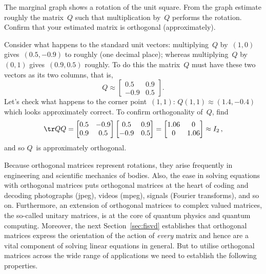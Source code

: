 \begin{example} \label{eg:introt}
The marginal graph shows a rotation of the unit square. 
\def\unithousesize{footnotesize,grid} 
%
From the graph estimate roughly the matrix~\(Q\) such that multiplication by~\(Q\) performs the rotation. 
Confirm that your estimated matrix is orthogonal (approximately).
\begin{solution} 
Consider what happens to the standard unit vectors:  multiplying~\(Q\) by~\((1,0)\) gives~\((0.5,-0.9)\) to roughly (one decimal place); whereas multiplying~\(Q\) by~\((0,1)\) gives~\((0.9,0.5)\) roughly.
To do this the matrix~\(Q\) must have these two vectors as its two columns, that is,
\begin{equation*}
Q\approx\begin{bmatrix} 0.5&0.9\\-0.9&0.5 \end{bmatrix}.
\end{equation*}
Let's check what happens to the corner point~\((1,1)\): \(Q(1,1)\approx (1.4,-0.4)\) which looks approximately correct.
To confirm orthogonality of~\(Q\), find
\begin{equation*}
\tr QQ=\begin{bmatrix} 0.5&-0.9\\0.9&0.5 \end{bmatrix}
\begin{bmatrix} 0.5&0.9\\-0.9&0.5 \end{bmatrix}
=\begin{bmatrix} 1.06&0\\0&1.06 \end{bmatrix}\approx I_2\,,
\end{equation*}
and so \(Q\)~is approximately orthogonal.
\end{solution}
\end{example}


Because orthogonal matrices represent rotations, they arise frequently in engineering and scientific mechanics of bodies.
Also, the ease in solving equations with orthogonal matrices puts orthogonal matrices at the heart of coding and decoding photographs (jpeg), videos (mpeg), signals (Fourier transforms), and so on.
Furthermore, an extension of orthogonal matrices to complex valued matrices, the so-called unitary matrices, is at the core of quantum physics and quantum computing.
Moreover, the next Section~\ref{sec:fisvd} establishes that orthogonal matrices express the orientation of the action of \emph{every} matrix and hence are a vital component of solving linear equations in general.
But to utilise orthogonal matrices across the wide range of applications we need to establish the following properties.




